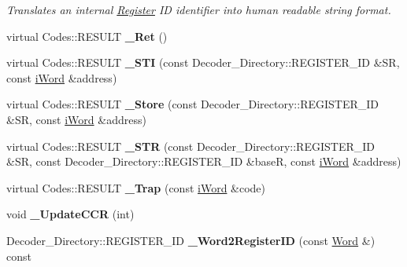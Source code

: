 \begin{DoxyCompactItemize}
\begin{DoxyCompactList}\small\item\em Translates an internal \hyperlink{classRegister}{Register} ID identifier into human readable string format. \item\end{DoxyCompactList}\item 
\hypertarget{classWi11_a8cbd4e75c8c10f69f4159c02955b4a1f}{
virtual Codes::RESULT {\bfseries \_\-Ret} ()}
\label{classWi11_a8cbd4e75c8c10f69f4159c02955b4a1f}

\item 
\hypertarget{classWi11_a914c3e753a0182effc6d01f3de4cdd24}{
virtual Codes::RESULT {\bfseries \_\-STI} (const Decoder\_\-Directory::REGISTER\_\-ID \&SR, const \hyperlink{classiWord}{iWord} \&address)}
\label{classWi11_a914c3e753a0182effc6d01f3de4cdd24}

\item 
\hypertarget{classWi11_ac65b835648a3ecdaa76ceaf49141d3d6}{
virtual Codes::RESULT {\bfseries \_\-Store} (const Decoder\_\-Directory::REGISTER\_\-ID \&SR, const \hyperlink{classiWord}{iWord} \&address)}
\label{classWi11_ac65b835648a3ecdaa76ceaf49141d3d6}

\item 
\hypertarget{classWi11_ac623d5c7aac534d1eb774892b82c28ec}{
virtual Codes::RESULT {\bfseries \_\-STR} (const Decoder\_\-Directory::REGISTER\_\-ID \&SR, const Decoder\_\-Directory::REGISTER\_\-ID \&baseR, const \hyperlink{classiWord}{iWord} \&address)}
\label{classWi11_ac623d5c7aac534d1eb774892b82c28ec}

\item 
\hypertarget{classWi11_ac62ce0a9f8df8dacab577cee514cb199}{
virtual Codes::RESULT {\bfseries \_\-Trap} (const \hyperlink{classiWord}{iWord} \&code)}
\label{classWi11_ac62ce0a9f8df8dacab577cee514cb199}

\item 
\hypertarget{classWi11_a55dd619a7cf329849f5a3b22e37d00ed}{
void {\bfseries \_\-UpdateCCR} (int)}
\label{classWi11_a55dd619a7cf329849f5a3b22e37d00ed}

\item 
\hypertarget{classWi11_abba9724054093a987468c0b14bf8fcda}{
Decoder\_\-Directory::REGISTER\_\-ID {\bfseries \_\-Word2RegisterID} (const \hyperlink{classWord}{Word} \&) const }
\label{classWi11_abba9724054093a987468c0b14bf8fcda}

\end{DoxyCompactItemize}
